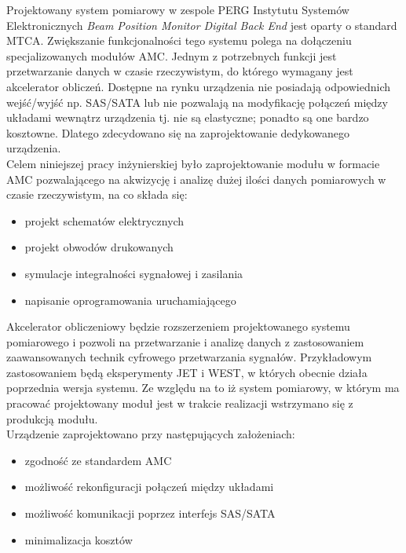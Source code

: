 Projektowany system pomiarowy w zespole PERG Instytutu Systemów Elektronicznych \textit{Beam Position Monitor Digital Back End} jest oparty o standard MTCA. Zwiększanie funkcjonalności tego systemu polega na dołączeniu specjalizowanych modułów AMC. Jednym z potrzebnych funkcji jest przetwarzanie danych w czasie rzeczywistym, do którego wymagany jest akcelerator obliczeń. Dostępne na rynku urządzenia nie posiadają odpowiednich wejść/wyjść np. SAS/SATA lub nie pozwalają na modyfikację połączeń między układami wewnątrz urządzenia tj. nie są elastyczne; ponadto są one bardzo kosztowne. Dlatego zdecydowano się na zaprojektowanie dedykowanego urządzenia.  \\

Celem niniejszej pracy inżynierskiej było zaprojektowanie modułu w formacie AMC pozwalającego na akwizycję i analizę dużej ilości danych pomiarowych w czasie rzeczywistym, na co składa się:
\begin{itemize}
\item projekt schematów elektrycznych
\item projekt obwodów drukowanych
\item symulacje integralności sygnałowej i zasilania
\item napisanie oprogramowania uruchamiającego
\end{itemize}

Akcelerator obliczeniowy będzie rozszerzeniem projektowanego systemu pomiarowego i pozwoli na przetwarzanie i analizę danych  z zastosowaniem zaawansowanych technik cyfrowego przetwarzania sygnałów. Przykładowym zastosowaniem będą eksperymenty JET i WEST, w których obecnie działa poprzednia wersja systemu. Ze względu na to iż system pomiarowy, w którym ma pracować projektowany moduł jest w trakcie realizacji wstrzymano się z produkcją modułu.\\
 
Urządzenie zaprojektowano przy następujących założeniach:


\begin{itemize}
		\item
		zgodność ze standardem AMC
		
		\item
		możliwość rekonfiguracji połączeń między układami
		
		\item
		możliwość komunikacji poprzez interfejs SAS/SATA
		
		\item
		minimalizacja kosztów

\end{itemize}


